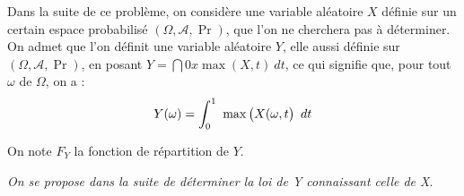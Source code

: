 \documentclass[11pt]{article}%
\begin{document}
\noindent Dans la suite de ce problème, on considère une variable
aléatoire $X$ définie sur un certain espace probabilisé $(\Omega,
\mathcal{A}, \Pr)$, que l'on ne cherchera pas à déterminer. \\
On admet que l'on définit une variable aléatoire $Y$, elle aussi
définie sur $(\Omega, \mathcal{A}, \Pr)$, en posant $Y = \dint{0}{x}
\max ( X, t)\ dt$, ce qui signifie que, pour tout $\omega$ de $\Omega$,
on a : 
\[
 Y (\omega) = \dint{0}{1} \max \left( X (\omega, t \rule{0cm}{0.3cm}
\right)\ dt 
\]

\noindent On note $F_{Y}$ la fonction de répartition de $Y$.
\begin{center}
\textit{On se propose dans la suite de déterminer la loi de Y
connaissant celle de X}.
\end{center}
\end{document}
